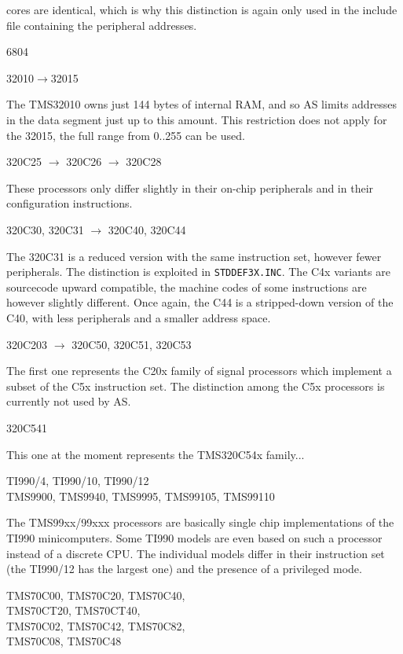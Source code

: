 \documentclass[12pt,twoside]{report}
\newcommand{\tty}[1]{{\tt #1}}
\newcommand{\asname}{{AS}}
\begin{document}
cores are identical, which is why this distinction is again only used
in the include file containing the peripheral addresses.
\begin{cpulist}
   6804
\end{cpulist}
\begin{cpulist}
   32010$\rightarrow$32015
\end{cpulist}
The TMS32010 owns just 144 bytes of internal RAM, and so \asname{} limits
addresses in the data segment just up to this amount.  This restriction
does not apply for the 32015, the full range from 0..255 can be used.
\begin{cpulist}
   320C25 $\rightarrow$ 320C26 $\rightarrow$ 320C28
\end{cpulist}
These processors only differ slightly in their on-chip peripherals
and in their configuration instructions.
\begin{cpulist}
   320C30, 320C31 $\rightarrow$ 320C40, 320C44
\end{cpulist}
The 320C31 is a reduced version with the same instruction set,
however fewer peripherals.  The distinction is exploited in
\tty{STDDEF3X.INC}.  The C4x variants are sourcecode upward
compatible, the machine codes of some instructions are however
slightly different.  Once again, the C44 is a stripped-down
version of the C40, with less peripherals and a smaller address
space.
\begin{cpulist}
   320C203 $\rightarrow$ 320C50, 320C51, 320C53
\end{cpulist}
The first one represents the C20x family of signal processors which
implement a subset of the C5x instruction set.  The distinction among the
C5x processors is currently not used by \asname{}.
\begin{cpulist}
   320C541
\end{cpulist}
This one at the moment represents the TMS320C54x family...
\begin{cpulist}
   TI990/4, TI990/10, TI990/12 \\
\> TMS9900, TMS9940, TMS9995, TMS99105, TMS99110
\end{cpulist}
The TMS99xx/99xxx processors are basically single chip implementations
of the TI990 minicomputers.  Some TI990 models are even based on such
a processor instead of a discrete CPU.  The individual models differ in their
instruction set (the TI990/12 has the largest one) and the presence of a
privileged mode.
\begin{cpulist}
   TMS70C00, TMS70C20, TMS70C40,\\
\> TMS70CT20, TMS70CT40,\\
\> TMS70C02, TMS70C42, TMS70C82,\\
\> TMS70C08, TMS70C48
\end{cpulist}
\end{document}
